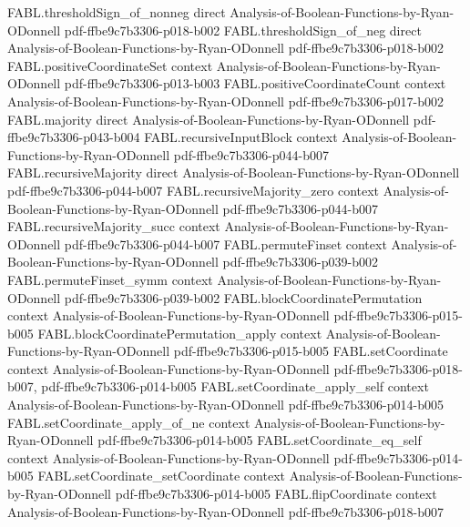 \begin{theorem}
\proofstep
  {FABL.thresholdSign_of_nonneg}
  {direct}
  {Analysis-of-Boolean-Functions-by-Ryan-ODonnell}
  {pdf-ffbe9c7b3306-p018-b002}
\proofstep
  {FABL.thresholdSign_of_neg}
  {direct}
  {Analysis-of-Boolean-Functions-by-Ryan-ODonnell}
  {pdf-ffbe9c7b3306-p018-b002}
\proofstep
  {FABL.positiveCoordinateSet}
  {context}
  {Analysis-of-Boolean-Functions-by-Ryan-ODonnell}
  {pdf-ffbe9c7b3306-p013-b003}
\proofstep
  {FABL.positiveCoordinateCount}
  {context}
  {Analysis-of-Boolean-Functions-by-Ryan-ODonnell}
  {pdf-ffbe9c7b3306-p017-b002}
\proofstep
  {FABL.majority}
  {direct}
  {Analysis-of-Boolean-Functions-by-Ryan-ODonnell}
  {pdf-ffbe9c7b3306-p043-b004}
\proofstep
  {FABL.recursiveInputBlock}
  {context}
  {Analysis-of-Boolean-Functions-by-Ryan-ODonnell}
  {pdf-ffbe9c7b3306-p044-b007}
\proofstep
  {FABL.recursiveMajority}
  {direct}
  {Analysis-of-Boolean-Functions-by-Ryan-ODonnell}
  {pdf-ffbe9c7b3306-p044-b007}
\proofstep
  {FABL.recursiveMajority_zero}
  {context}
  {Analysis-of-Boolean-Functions-by-Ryan-ODonnell}
  {pdf-ffbe9c7b3306-p044-b007}
\proofstep
  {FABL.recursiveMajority_succ}
  {context}
  {Analysis-of-Boolean-Functions-by-Ryan-ODonnell}
  {pdf-ffbe9c7b3306-p044-b007}
\proofstep
  {FABL.permuteFinset}
  {context}
  {Analysis-of-Boolean-Functions-by-Ryan-ODonnell}
  {pdf-ffbe9c7b3306-p039-b002}
\proofstep
  {FABL.permuteFinset_symm}
  {context}
  {Analysis-of-Boolean-Functions-by-Ryan-ODonnell}
  {pdf-ffbe9c7b3306-p039-b002}
\proofstep
  {FABL.blockCoordinatePermutation}
  {context}
  {Analysis-of-Boolean-Functions-by-Ryan-ODonnell}
  {pdf-ffbe9c7b3306-p015-b005}
\proofstep
  {FABL.blockCoordinatePermutation_apply}
  {context}
  {Analysis-of-Boolean-Functions-by-Ryan-ODonnell}
  {pdf-ffbe9c7b3306-p015-b005}
\proofstep
  {FABL.setCoordinate}
  {context}
  {Analysis-of-Boolean-Functions-by-Ryan-ODonnell}
  {pdf-ffbe9c7b3306-p018-b007,
    pdf-ffbe9c7b3306-p014-b005}
\proofstep
  {FABL.setCoordinate_apply_self}
  {context}
  {Analysis-of-Boolean-Functions-by-Ryan-ODonnell}
  {pdf-ffbe9c7b3306-p014-b005}
\proofstep
  {FABL.setCoordinate_apply_of_ne}
  {context}
  {Analysis-of-Boolean-Functions-by-Ryan-ODonnell}
  {pdf-ffbe9c7b3306-p014-b005}
\proofstep
  {FABL.setCoordinate_eq_self}
  {context}
  {Analysis-of-Boolean-Functions-by-Ryan-ODonnell}
  {pdf-ffbe9c7b3306-p014-b005}
\proofstep
  {FABL.setCoordinate_setCoordinate}
  {context}
  {Analysis-of-Boolean-Functions-by-Ryan-ODonnell}
  {pdf-ffbe9c7b3306-p014-b005}
\proofstep
  {FABL.flipCoordinate}
  {context}
  {Analysis-of-Boolean-Functions-by-Ryan-ODonnell}
  {pdf-ffbe9c7b3306-p018-b007}

\end{theorem}
